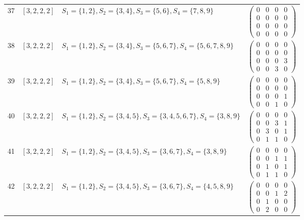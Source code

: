 \begin{longtable}{@{}r>{\raggedright\arraybackslash}p{1.5cm}>{\raggedright\arraybackslash}p{8.4cm}>{\raggedright\arraybackslash}p{4.2cm}@{}}
37 & $[3,2,2,2]$ & $S_{1}=\{1,2\}, S_{2}=\{3,4\}, S_{3}=\{5,6\}, S_{4}=\{7,8,9\}$ & $\left(\begin{smallmatrix}0 & 0 & 0 & 0\\0 & 0 & 0 & 0\\0 & 0 & 0 & 0\\0 & 0 & 0 & 0\end{smallmatrix}\right)$ \\
38 & $[3,2,2,2]$ & $S_{1}=\{1,2\}, S_{2}=\{3,4\}, S_{3}=\{5,6,7\}, S_{4}=\{5,6,7,8,9\}$ & $\left(\begin{smallmatrix}0 & 0 & 0 & 0\\0 & 0 & 0 & 0\\0 & 0 & 0 & 3\\0 & 0 & 3 & 0\end{smallmatrix}\right)$ \\
39 & $[3,2,2,2]$ & $S_{1}=\{1,2\}, S_{2}=\{3,4\}, S_{3}=\{5,6,7\}, S_{4}=\{5,8,9\}$ & $\left(\begin{smallmatrix}0 & 0 & 0 & 0\\0 & 0 & 0 & 0\\0 & 0 & 0 & 1\\0 & 0 & 1 & 0\end{smallmatrix}\right)$ \\
40 & $[3,2,2,2]$ & $S_{1}=\{1,2\}, S_{2}=\{3,4,5\}, S_{3}=\{3,4,5,6,7\}, S_{4}=\{3,8,9\}$ & $\left(\begin{smallmatrix}0 & 0 & 0 & 0\\0 & 0 & 3 & 1\\0 & 3 & 0 & 1\\0 & 1 & 1 & 0\end{smallmatrix}\right)$ \\
41 & $[3,2,2,2]$ & $S_{1}=\{1,2\}, S_{2}=\{3,4,5\}, S_{3}=\{3,6,7\}, S_{4}=\{3,8,9\}$ & $\left(\begin{smallmatrix}0 & 0 & 0 & 0\\0 & 0 & 1 & 1\\0 & 1 & 0 & 1\\0 & 1 & 1 & 0\end{smallmatrix}\right)$ \\
42 & $[3,2,2,2]$ & $S_{1}=\{1,2\}, S_{2}=\{3,4,5\}, S_{3}=\{3,6,7\}, S_{4}=\{4,5,8,9\}$ & $\left(\begin{smallmatrix}0 & 0 & 0 & 0\\0 & 0 & 1 & 2\\0 & 1 & 0 & 0\\0 & 2 & 0 & 0\end{smallmatrix}\right)$ \\

\end{longtable}
